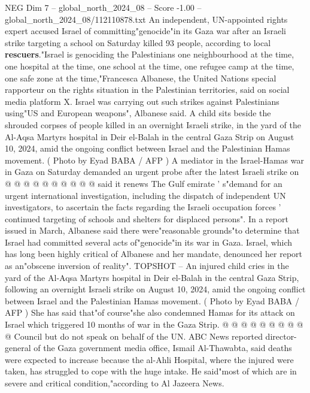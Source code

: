 \begin{textsample}{NEG Dim 7 – global\_north\_2024\_08 – Score -1.00 – global\_north\_2024\_08/112110878.txt}  \label{ex:f7_neg_440}
An independent, UN-appointed rights expert accused Israel of committing"genocide"in its Gaza war after an Israeli strike targeting a school on Saturday killed 93 people, according to local \textbf{rescuers}."Israel is genociding the Palestinians one neighbourhood at the time, one hospital at the time, one school at the time, one refugee camp at the time, one safe zone at the time,"Francesca Albanese, the United Nations special rapporteur on the rights situation in the Palestinian territories, said on social media platform X.
Israel was carrying out such strikes against Palestinians using"US and European weapons", Albanese said.
A child sits beside the shrouded corpses of people killed in an overnight Israeli strike, in the yard of the Al-Aqsa Martyrs hospital in Deir el-Balah in the central Gaza Strip on August 10, 2024, amid the ongoing conflict between Israel and the Palestinian Hamas movement. ( Photo by Eyad BABA / AFP ) A mediator in the Israel-Hamas war in Gaza on Saturday demanded an urgent probe after the latest Israeli strike on @ @ @ @ @ @ @ @ @ @ said it renews The Gulf emirate ' s"demand for an urgent international investigation, including the dispatch of independent UN investigators, to ascertain the facts regarding the Israeli occupation forces ' continued targeting of schools and shelters for displaced persons".
In a report issued in March, Albanese said there were"reasonable grounds"to determine that Israel had committed several acts of"genocide"in its war in Gaza.
Israel, which has long been highly critical of Albanese and her mandate, denounced her report as an"obscene inversion of reality".
TOPSHOT -- An injured child cries in the yard of the Al-Aqsa Martyrs hospital in Deir el-Balah in the central Gaza Strip, following an overnight Israeli strike on August 10, 2024, amid the ongoing conflict between Israel and the Palestinian Hamas movement. ( Photo by Eyad BABA / AFP ) She has said that"of course"she also condemned Hamas for its attack on Israel which triggered 10 months of war in the Gaza Strip. @ @ @ @ @ @ @ @ @ @ Council but do not speak on behalf of the UN.
ABC News reported director-general of the Gaza government media office, Ismail Al-Thawabta, said deaths were expected to increase because the al-Ahli Hospital, where the injured were taken, has struggled to cope with the huge intake.
He said"most of which are in severe and critical condition,"according to Al Jazeera News.

\end{textsample}
